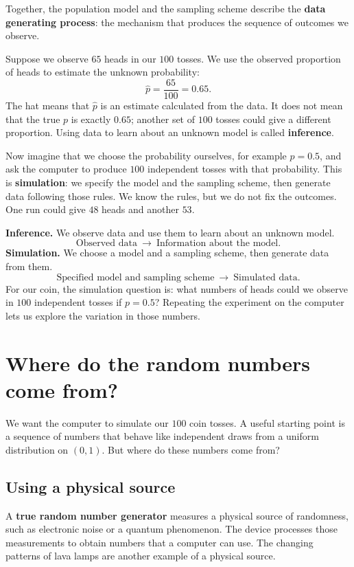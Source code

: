 \documentclass[a4paper,12pt,oneside]{report}
\begin{document}
Together, the population model and the sampling scheme describe the
\textbf{data generating process}: the mechanism that produces the
sequence of outcomes we observe.

Suppose we observe $65$ heads in our $100$ tosses. We use the observed
proportion of heads to estimate the unknown probability:
\[
  \widehat p=\frac{65}{100}=0.65.
\]
The hat means that $\widehat p$ is an estimate calculated from the
data. It does not mean that the true $p$ is exactly $0.65$; another
set of $100$ tosses could give a different proportion. Using data to
learn about an unknown model is called \textbf{inference}.

Now imagine that we choose the probability ourselves, for example
$p=0.5$, and ask the computer to produce $100$ independent tosses
with that probability. This is \textbf{simulation}: we specify the
model and the sampling scheme, then generate data following those
rules. We know the rules, but we do not fix the outcomes. One run
could give $48$ heads and another $53$.

\begin{notebox}
\textbf{Inference.} We observe data and use them to learn about an
unknown model.
\[
  \text{Observed data}\ \longrightarrow\ \text{Information about the model}.
\]
\textbf{Simulation.} We choose a model and a sampling scheme, then
generate data from them.
\[
  \text{Specified model and sampling scheme}\ \longrightarrow\ \text{Simulated data}.
\]
For our coin, the simulation question is: what numbers of heads
could we observe in $100$ independent tosses if $p=0.5$?
Repeating the experiment on the computer lets us explore the
variation in those numbers.
\end{notebox}

\section{Where do the random numbers come from?}
\label{sec:random-number-generators}
We want the computer to simulate our $100$ coin tosses. A useful
starting point is a sequence of numbers that behave like independent
draws from a uniform distribution on $(0,1)$. But where do these
numbers come from?

\subsection{Using a physical source}
A \textbf{true random number generator} measures a physical source
of randomness, such as electronic noise or a quantum phenomenon.
The device processes those measurements to obtain numbers that a
computer can use. The changing patterns of lava lamps are another
example of a physical source.
\end{document}
